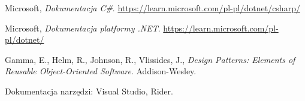 \documentclass[polish,12pt,twoside,a4paper]{report}
\begin{document}




\newpage

\newpage

\newpage

\newpage

\newpage

\newpage

\newpage

\begin{thebibliography}{6}
    \item Microsoft, \textit{Dokumentacja C\#}. \url{https://learn.microsoft.com/pl-pl/dotnet/csharp/}
    \item Microsoft, \textit{Dokumentacja platformy .NET}. \url{https://learn.microsoft.com/pl-pl/dotnet/}
    \item Gamma, E., Helm, R., Johnson, R., Vlissides, J., \textit{Design Patterns: Elements of Reusable Object-Oriented Software}. Addison-Wesley.
    \item Dokumentacja narzędzi: Visual Studio, Rider.
\end{thebibliography}

\newpage


\end{document}

